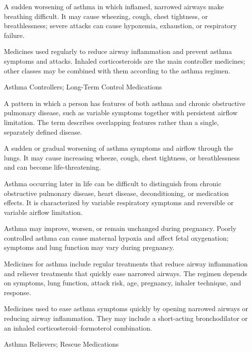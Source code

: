  A sudden worsening of asthma in which inflamed, narrowed airways make breathing difficult. It may cause wheezing, cough, chest tightness, or breathlessness; severe attacks can cause hypoxemia, exhaustion, or respiratory failure.

 Medicines used regularly to reduce airway inflammation and prevent asthma symptoms and attacks. Inhaled corticosteroids are the main controller medicines; other classes may be combined with them according to the asthma regimen.

\synonyms
Asthma Controllers; Long-Term Control Medications

 A pattern in which a person has features of both
asthma and chronic obstructive pulmonary disease, such as variable symptoms
together with persistent airflow limitation. The term describes overlapping
features rather than a single, separately defined disease.

 A sudden or gradual worsening of asthma symptoms and airflow through the lungs. It may cause increasing wheeze, cough, chest tightness, or breathlessness and can become life-threatening.

 Asthma occurring later in life can be difficult
to distinguish from chronic obstructive pulmonary disease, heart disease,
deconditioning, or medication effects. It is characterized by variable
respiratory symptoms and reversible or variable airflow limitation.

 Asthma may improve, worsen, or remain unchanged during pregnancy. Poorly controlled asthma can cause maternal hypoxia and affect fetal oxygenation; symptoms and lung function may vary during pregnancy.

 Medicines for asthma include regular treatments that reduce airway inflammation and reliever treatments that quickly ease narrowed airways. The regimen depends on symptoms, lung function, attack risk, age, pregnancy, inhaler technique, and response.

 Medicines used to ease asthma
symptoms quickly by opening narrowed airways or reducing airway inflammation.
They may include a short-acting bronchodilator or an inhaled
corticosteroid--formoterol combination.

\synonyms
Asthma Relievers; Rescue Medications

